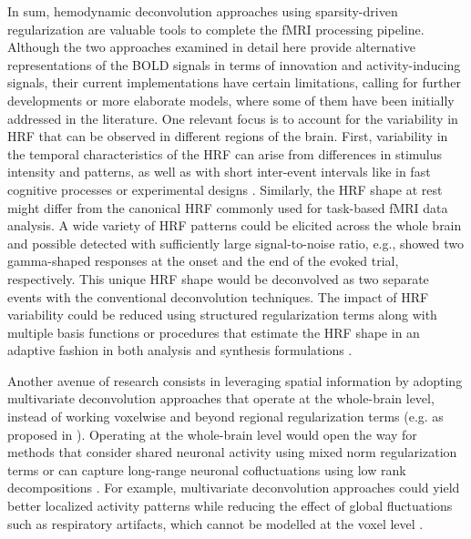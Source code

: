 In sum, hemodynamic deconvolution approaches using sparsity-driven
regularization are valuable tools to complete the fMRI processing pipeline.
Although the two approaches examined in detail here provide alternative
representations of the BOLD signals in terms of innovation and activity-inducing
signals, their current implementations have certain limitations, calling for
further developments or more elaborate models, where some of them have been
initially addressed in the literature. One relevant focus is to account for the
variability in HRF that can be observed in different regions of the brain.
First, variability in the temporal characteristics of the HRF can arise from
differences in stimulus intensity and patterns, as well as with short
inter-event intervals like in fast cognitive processes or experimental designs
\citep{Yesilyurt2008DynamicsnonlinearitiesBOLD,
Sadaghiani2009Neuralactivityinduced,Chen2021Investigatingmechanismsfast,Polimeni2021Imagingfasterneural}.
Similarly, the HRF shape at rest might differ from the canonical HRF commonly
used for task-based fMRI data analysis. A wide variety of HRF patterns could be
elicited across the whole brain and possible detected with sufficiently large
signal-to-noise ratio, e.g., \citep{GonzalezCastillo2012Wholebraintime} showed
two gamma-shaped responses at the onset and the end of the evoked trial,
respectively. This unique HRF shape would be deconvolved as two separate events
with the conventional deconvolution techniques. The impact of HRF variability
could be reduced using structured regularization terms along with multiple basis
functions \citep{Gaudes2012Structuredsparsedeconvolution} or procedures that
estimate the HRF shape in an adaptive fashion in both analysis
\citep{Farouj2019BoldSignalDeconvolution} and synthesis formulations
\citep{Cherkaoui2021Multivariatesemiblind}.

Another avenue of research consists in leveraging spatial information by
adopting multivariate deconvolution approaches that operate at the whole-brain
level, instead of working voxelwise and beyond regional regularization terms
(e.g. as proposed in \citealt{Karahanoglu2013TotalactivationfMRI}). Operating at
the whole-brain level would open the way for methods that consider shared
neuronal activity using mixed norm regularization terms
\citep{urunuela-tremino_2019} or can capture long-range neuronal cofluctuations
using low rank decompositions \citep{Cherkaoui2021Multivariatesemiblind}. For example,
multivariate deconvolution approaches could yield better localized activity
patterns while reducing the effect of global fluctuations such as respiratory
artifacts, which cannot be modelled at the voxel level \citep{Urunuela_2021}.

